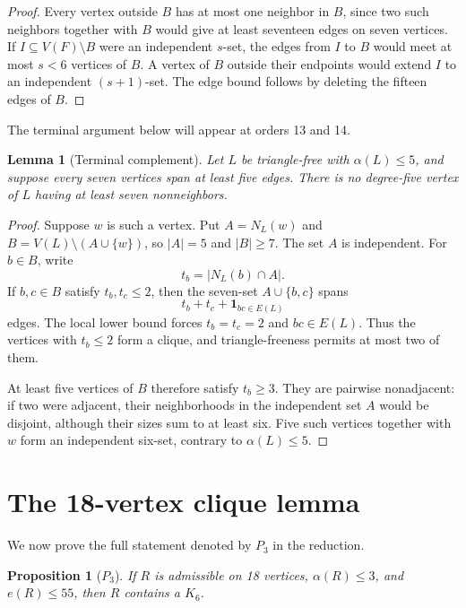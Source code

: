 \documentclass[11pt,reqno,a4paper]{amsart}
\newtheorem{proposition}[theorem]{Proposition}
\newtheorem{lemma}[theorem]{Lemma}
\theoremstyle{definition}
\theoremstyle{remark}
\newcommand{\one}{\mathbf{1}}
\begin{document}
\begin{proof}
Every vertex outside $B$ has at most one neighbor in $B$, since two such
neighbors together with $B$ would give at least seventeen edges on seven
vertices.  If $I\subseteq V(F)\setminus B$ were an independent $s$-set,
the edges from $I$ to $B$ would meet at most $s<6$ vertices of $B$.  A vertex
of $B$ outside their endpoints would extend $I$ to an independent
$(s+1)$-set.  The edge bound follows by deleting the fifteen edges of $B$.
\end{proof}

The terminal argument below will appear at orders 13 and 14.

\begin{lemma}[Terminal complement]\label{lem:terminal}
Let $L$ be triangle-free with $\alpha(L)\leq5$, and suppose every seven
vertices span at least five edges.  There is no degree-five vertex of $L$
having at least seven nonneighbors.
\end{lemma}

\begin{proof}
Suppose $w$ is such a vertex.  Put $A=N_L(w)$ and
$B=V(L)\setminus(A\cup\{w\})$, so $|A|=5$ and $|B|\geq7$.  The set $A$ is
independent.  For
$b\in B$, write
\[
  t_b=|N_L(b)\cap A|.
\]
If $b,c\in B$ satisfy $t_b,t_c\leq2$, then the seven-set
$A\cup\{b,c\}$ spans
\[
  t_b+t_c+\one_{bc\in E(L)}
\]
edges.  The local lower bound forces $t_b=t_c=2$ and $bc\in E(L)$.  Thus
the vertices with $t_b\leq2$ form a clique, and triangle-freeness permits at
most two of them.

At least five vertices of $B$ therefore satisfy $t_b\geq3$.  They are
pairwise nonadjacent: if two were adjacent, their neighborhoods in the
independent set $A$ would be disjoint, although their sizes sum to at least
six.  Five such vertices together with $w$ form an independent six-set,
contrary to $\alpha(L)\leq5$.
\end{proof}

\section{The 18-vertex clique lemma}

We now prove the full statement denoted by $P_3$ in the reduction.

\begin{proposition}[$P_3$]\label{prop:P3}
If $R$ is admissible on 18 vertices, $\alpha(R)\leq3$, and $e(R)\leq55$,
then $R$ contains a $K_6$.
\end{proposition}
\end{document}
